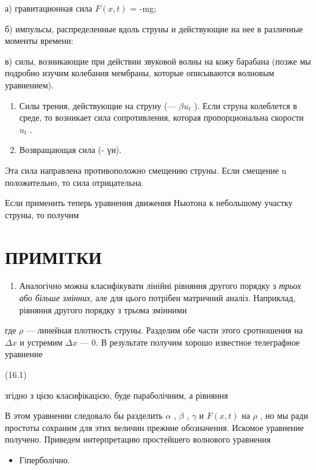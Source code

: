 \documentclass[
  ukrainian,
]{article}
\providecommand{\tightlist}{%
  \setlength{\itemsep}{0pt}\setlength{\parskip}{0pt}}
\begin{document}
а) гравитационная сила \(F(x, t)\) = -mg;

б) импульсы, распределенные вдоль струны и действующие на нее в
различные моменты времени:

в) силы, возникающие при действии звуковой волны на кожу барабана (позже
мы подробно изучим колебания мембраны, которые описываются волновым
уравнением).

\begin{enumerate}
\def\labelenumi{\arabic{enumi}.}
\setcounter{enumi}{2}
\item
  Силы трения, действующие на струну (--- \(\beta u_t\) ). Если струна
  колеблется в среде, то возникает сила сопротивления, которая
  пропорциональна скорости \(u_t\) .
\item
  Возвращающая сила (- үи).
\end{enumerate}

Эта сила направлена противоположно смещению струны. Если смещение u
положительно, то сила отрицательна.

Если применить теперь уравнения движения Ньютона к небольшому участку
струны, то получим

\section{ПРИМІТКИ}\label{ux43fux440ux438ux43cux456ux442ux43aux438-2}

\begin{enumerate}
\def\labelenumi{\arabic{enumi}.}
\tightlist
\item
  Аналогічно можна класифікувати лінійні рівняння другого порядку з
  \emph{трьох або більше змінних}, але для цього потрібен матричний
  аналіз. Наприклад, рівняння другого порядку з трьома змінними
\end{enumerate}

где \(\rho\) --- линейная плотность струны. Разделим обе части этого
сротношения на \(\Delta x\) и устремим \(\Delta x\) --- 0. В результате
получим хорошо известное телеграфное уравнение

(16.1)

згідно з цією класифікацією, буде параболічним, а рівняння

В этом уравнении следовало бы разделить \(\alpha\) , \(\beta\) ,
\(\gamma\) и \(F(x,t)\) на \(\rho\) , но мы ради простоты сохраним для
этих величин прежние обозначения. Искомое уравнение получено. Приведем
интерпретацию простейшего волнового уравнения

\begin{itemize}
\tightlist
\item
  Гіперболічно.
\end{itemize}
\end{document}
